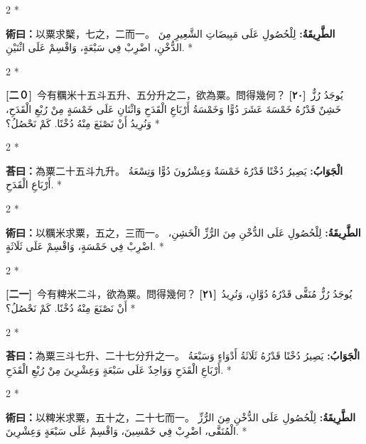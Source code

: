 \documentclass[11pt,a4paper]{article}
\newcommand{\ar}[1]{\arabicfont\beginR #1\endR}
\newcommand{\problemnum}[1]{\textbf{[\ignorespaces#1\unskip]}}
\newenvironment{bilingual}{%
  \begin{paracol}{2}%
  \switchcolumn[0]*%
}{%
  \end{paracol}%
}
\newcommand{\cnline}[1]{\switchcolumn[0]\noindent #1 \switchcolumn[1]}
\newcommand{\arline}[1]{\noindent\ar{#1} \switchcolumn[0]*}
\newenvironment{prob bilingual}{%
  \begin{paracol}{2}%
  \switchcolumn[0]*%
}{%
  \end{paracol}%
  \vspace{0.3em}%
}
\begin{document}
\begin{bilingual}
\cnline{%
\textcolor{methodcolor}{\textbf{術曰：}}以粟求櫱，七之，二而一。
}
\arline{%
\textcolor{methodcolor}{\textbf{الطَّرِيقَةُ:}} لِلْحُصُولِ عَلَى مَبِيضَاتِ الشَّعِيرِ مِنَ الدُّخْنِ، اضْرِبْ فِي سَبْعَةٍ، وَاقْسِمْ عَلَى اثْنَيْنِ.
}
\end{bilingual}

\begin{bilingual}
\cnline{\problemnum{二０}\, 今有糲米十五斗五升、五分升之二，欲為粟。問得幾何？}
\arline{\problemnum{٢٠}\, يُوجَدُ رُزٌّ خَشِنٌ قَدْرُهُ خَمْسَةَ عَشَرَ دُوًّا وَخَمْسَةُ أَرْبَاعِ الْقَدَحِ وَاثْنَانِ عَلَى خَمْسَةٍ مِنْ رُبْعِ الْقَدَحِ، وَنُرِيدُ أَنْ نَصْنَعَ مِنْهُ دُخْنًا. كَمْ نَحْصُلُ؟}
\end{bilingual}

\begin{bilingual}
\cnline{\textcolor{answercolor}{\textbf{荅曰：}}為粟二十五斗九升。}
\arline{\textcolor{answercolor}{\textbf{الْجَوَابُ:}} يَصِيرُ دُخْنًا قَدْرُهُ خَمْسَةٌ وَعِشْرُونَ دُوًّا وَتِسْعَةُ أَرْبَاعِ الْقَدَحِ.}
\end{bilingual}

\begin{bilingual}
\cnline{%
\textcolor{methodcolor}{\textbf{術曰：}}以糲米求粟，五之，三而一。
}
\arline{%
\textcolor{methodcolor}{\textbf{الطَّرِيقَةُ:}} لِلْحُصُولِ عَلَى الدُّخْنِ مِنَ الرُّزِّ الْخَشِنِ، اضْرِبْ فِي خَمْسَةٍ، وَاقْسِمْ عَلَى ثَلَاثَةٍ.
}
\end{bilingual}

\begin{bilingual}
\cnline{\problemnum{二一}\, 今有粺米二斗，欲為粟。問得幾何？}
\arline{\problemnum{٢١}\, يُوجَدُ رُزٌّ مُنَقًّى قَدْرُهُ دُوَّانِ، وَنُرِيدُ أَنْ نَصْنَعَ مِنْهُ دُخْنًا. كَمْ نَحْصُلُ؟}
\end{bilingual}

\begin{bilingual}
\cnline{\textcolor{answercolor}{\textbf{荅曰：}}為粟三斗七升、二十七分升之一。}
\arline{\textcolor{answercolor}{\textbf{الْجَوَابُ:}} يَصِيرُ دُخْنًا قَدْرُهُ ثَلَاثَةُ أَدْوَاءٍ وَسَبْعَةُ أَرْبَاعِ الْقَدَحِ وَوَاحِدٌ عَلَى سَبْعَةٍ وَعِشْرِينَ مِنْ رُبْعِ الْقَدَحِ.}
\end{bilingual}

\begin{bilingual}
\cnline{%
\textcolor{methodcolor}{\textbf{術曰：}}以粺米求粟，五十之，二十七而一。
}
\arline{%
\textcolor{methodcolor}{\textbf{الطَّرِيقَةُ:}} لِلْحُصُولِ عَلَى الدُّخْنِ مِنَ الرُّزِّ الْمُنَقَّى، اضْرِبْ فِي خَمْسِينَ، وَاقْسِمْ عَلَى سَبْعَةٍ وَعِشْرِينَ.
}
\end{bilingual}
\end{document}
